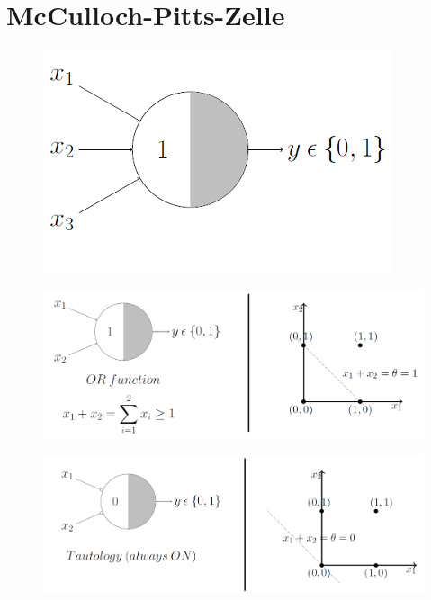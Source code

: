 \section{McCulloch-Pitts-Zelle} \label{ap:sc:mpz} %

\begin{figure}[!htb]
	\centering
	\includegraphics[width=.5\linewidth]{img/mpn_or2}
	\label{fig:mpn_or2}
\end{figure}

\begin{figure}[!htb]
	\centering
	\includegraphics[width=\linewidth]{img/mpn_or3}
	\label{fig:mpn_or3}
\end{figure}

\begin{figure}[!htb]
	\centering
	\includegraphics[width=\linewidth]{img/mpn_tautology}
	\label{fig:mpn_tautology}
\end{figure}


